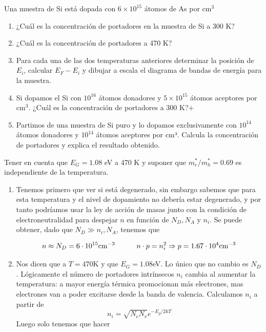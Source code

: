 \begin{texercise}
	Una muestra de Si está dopada con \( 6 \times 10^{15} \) átomos de As por cm$^3$
	\begin{enumerate}[label=\alph*)]
		\item ¿Cuál es la concentración de portadores en la muestra de Si a 300 K?
		\item ¿Cuál es la concentración de portadores a 470 K?
		\item Para cada una de las dos temperaturas anteriores determinar la posición de \( E_i \), calcular \( E_F - E_i \) y dibujar a escala el diagrama de bandas de energía para la muestra.
		\item Si dopamos el Si con \( 10^{16} \) átomos donadores y \( 5 \times 10^{15} \) átomos aceptores por cm$^3$. ¿Cuál es la concentración de portadores a 300 K?+
		\item Partimos de una muestra de Si puro y lo dopamos exclusivamente con \( 10^{14} \) átomos donadores y \( 10^{14} \) átomos aceptores por cm³. Calcula la concentración de portadores y explica el resultado obtenido.
	\end{enumerate}
	Tener en cuenta que \( E_G = 1.08 \) eV a 470 K y suponer que \( m_e^*/m_h^* = 0.69 \) es independiente de la temperatura.

	\tcblower
	\begin{enumerate}[label=\alph*)]
		\item Tenemos primero que ver si está degenerado, sin embargo sabemos que para esta temperatura y el nivel de dopamiento no debería estar degenerado, y por tanto podríamos usar la ley de acción de masas junto con la condición de electroneutralidad para despejar $n$ en función de $N_D,N_A$ y $n_i$. Se puede obtener, dado que $N_D \gg n_i,N_A$, tenemos que

		      \begin{equation}
			      n\approx N_D = 6\cdot 10^{15} \text{cm}^{-3} \quad \quad \quad n\cdot p = n_i^2 \Rightarrow p = 1.67 \cdot 10^4 \text{cm}^{-3}
		      \end{equation}
		\item Nos dicen que a $T=470$K y que $E_G=1.08$eV. Lo único que no cambio es $N_D$. Lógicamente el número de portadores intrínsecos $n_i$ cambia al aumentar la temperatura: a mayor energía térmica promocionan más electrones, mas electrones van a poder excitarse desde la banda de valencia. Calculamos $n_i$ a partir de
		      \begin{equation}
			      n_i = \sqrt{N_cN_v} e^{-E_g/2kT}
		      \end{equation}
		      Luego solo tenemos que hacer


\end{enumerate}
\end{texercise}
